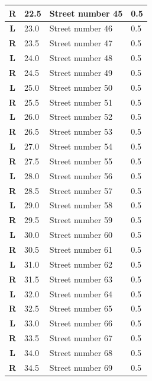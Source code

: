 \documentclass[11pt]{article}
\begin{document}
\begin{center}
\begin{supertabular}{|c|p{0.30in}|p{2.25in}|l|}
 \textbf{R} &  22.5 & Street number 45 &   0.5 \\ \hline
 \textbf{L} &  23.0 & Street number 46 &   0.5 \\ \hline
{} \textbf{R} &  23.5 & Street number 47 &   0.5 \\ \hline
 \textbf{L} &  24.0 & Street number 48 &   0.5 \\ \hline
{} \textbf{R} &  24.5 & Street number 49 &   0.5 \\ \hline
 \textbf{L} &  25.0 & Street number 50 &   0.5 \\ \hline
{} \textbf{R} &  25.5 & Street number 51 &   0.5 \\ \hline
 \textbf{L} &  26.0 & Street number 52 &   0.5 \\ \hline
{} \textbf{R} &  26.5 & Street number 53 &   0.5 \\ \hline
 \textbf{L} &  27.0 & Street number 54 &   0.5 \\ \hline
{} \textbf{R} &  27.5 & Street number 55 &   0.5 \\ \hline
 \textbf{L} &  28.0 & Street number 56 &   0.5 \\ \hline
{} \textbf{R} &  28.5 & Street number 57 &   0.5 \\ \hline
 \textbf{L} &  29.0 & Street number 58 &   0.5 \\ \hline
{} \textbf{R} &  29.5 & Street number 59 &   0.5 \\ \hline
 \textbf{L} &  30.0 & Street number 60 &   0.5 \\ \hline
{} \textbf{R} &  30.5 & Street number 61 &   0.5 \\ \hline
 \textbf{L} &  31.0 & Street number 62 &   0.5 \\ \hline
{} \textbf{R} &  31.5 & Street number 63 &   0.5 \\ \hline
 \textbf{L} &  32.0 & Street number 64 &   0.5 \\ \hline
{} \textbf{R} &  32.5 & Street number 65 &   0.5 \\ \hline
 \textbf{L} &  33.0 & Street number 66 &   0.5 \\ \hline
{} \textbf{R} &  33.5 & Street number 67 &   0.5 \\ \hline
 \textbf{L} &  34.0 & Street number 68 &   0.5 \\ \hline
{} \textbf{R} &  34.5 & Street number 69 &   0.5 \\ \hline

\end{supertabular}
\end{center}
\end{document}
